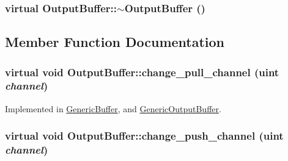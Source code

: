 \hypertarget{classOutputBuffer_928cc1b1e5cef13f3572c13775d547b5}{
\subsubsection[{$\sim$OutputBuffer}]{\setlength{\rightskip}{0pt plus 5cm}virtual OutputBuffer::$\sim$OutputBuffer ()}}
\label{classOutputBuffer_928cc1b1e5cef13f3572c13775d547b5}




\subsection{Member Function Documentation}
\hypertarget{classOutputBuffer_fb8e0a16f34dcff4c0d954201712f762}{
\subsubsection[{change\_\-pull\_\-channel}]{\setlength{\rightskip}{0pt plus 5cm}virtual void OutputBuffer::change\_\-pull\_\-channel ({\bf uint} {\em channel})}}
\label{classOutputBuffer_fb8e0a16f34dcff4c0d954201712f762}




Implemented in \hyperlink{classGenericBuffer_6d7fe4a638dc7eb0358c3490bf8d2cf4}{GenericBuffer}, and \hyperlink{classGenericOutputBuffer_c4f3cf09d07b340af349820bcaed731e}{GenericOutputBuffer}.\hypertarget{classOutputBuffer_45a685173b5c5cbe6270c9e0ce6d023a}{
\subsubsection[{change\_\-push\_\-channel}]{\setlength{\rightskip}{0pt plus 5cm}virtual void OutputBuffer::change\_\-push\_\-channel ({\bf uint} {\em channel})}}
\label{classOutputBuffer_45a685173b5c5cbe6270c9e0ce6d023a}




